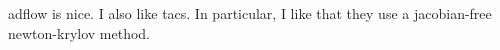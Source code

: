 \documentclass{article}
\begin{document}
adflow is nice. 
I also like tacs.
In particular, I like that they use a jacobian-free newton-krylov method. 

 
\end{document}

